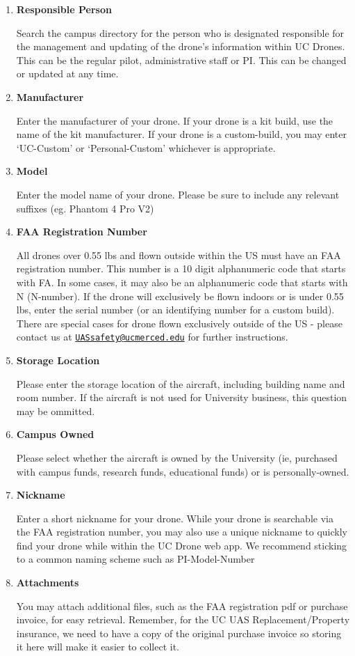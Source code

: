 \documentclass[
  12pt,
]{book}
\begin{document}
\begin{enumerate}
\def\labelenumi{\arabic{enumi}.}
\item
  \textbf{Responsible Person}

  Search the campus directory for the person who is designated responsible for the management and updating of the drone's information within UC Drones. This can be the regular pilot, administrative staff or PI. This can be changed or updated at any time.
\item
  \textbf{Manufacturer}

  Enter the manufacturer of your drone. If your drone is a kit build, use the name of the kit manufacturer. If your drone is a custom-build, you may enter `UC-Custom' or `Personal-Custom' whichever is appropriate.
\item
  \textbf{Model}

  Enter the model name of your drone. Please be sure to include any relevant suffixes (eg. Phantom 4 Pro V2)
\item
  \textbf{FAA Registration Number}

  All drones over 0.55 lbs and flown outside within the US must have an FAA registration number. This number is a 10 digit alphanumeric code that starts with FA. In some cases, it may also be an alphanumeric code that starts with N (N-number). If the drone will exclusively be flown indoors or is under 0.55 lbs, enter the serial number (or an identifying number for a custom build). There are special cases for drone flown exclusively outside of the US - please contact us at \href{mailto:UASsafety@ucmerced.edu}{\nolinkurl{UASsafety@ucmerced.edu}} for further instructions.
\item
  \textbf{Storage Location}

  Please enter the storage location of the aircraft, including building name and room number. If the aircraft is not used for University business, this question may be ommitted.
\item
  \textbf{Campus Owned}

  Please select whether the aircraft is owned by the University (ie, purchased with campus funds, research funds, educational funds) or is personally-owned.
\item
  \textbf{Nickname}

  Enter a short nickname for your drone. While your drone is searchable via the FAA registration number, you may also use a unique nickname to quickly find your drone while within the UC Drone web app. We recommend sticking to a common naming scheme such as PI-Model-Number
\item
  \textbf{Attachments}

  You may attach additional files, such as the FAA registration pdf or purchase invoice, for easy retrieval. Remember, for the UC UAS Replacement/Property insurance, we need to have a copy of the original purchase invoice so storing it here will make it easier to collect it.
\end{enumerate}
\end{document}
